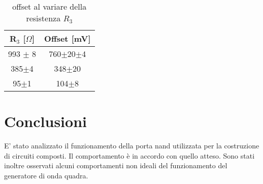 \begin{table}[h]
	\centering
	\begin{tabular}{cc}
		{R$_3$ [$\Omega$]} & {Offset [mV]}\\
		\midrule
           993 $\pm$ 8 & 760$\pm$20$\pm$4 \\
           385$\pm$4 & 348$\pm$20 \\
           95$\pm$1 & 104$\pm$8 \\
 	\end{tabular}
	\caption{offset al variare della resistenza $R_3$}
	\label{t:offset}
\end{table} 
 \section{Conclusioni}
 E' stato analizzato il funzionamento della porta nand utilizzata per la costruzione di circuiti composti. Il comportamento è in accordo con quello atteso. Sono stati inoltre osservati alcuni comportamenti non ideali del funzionamento del generatore di onda quadra.
